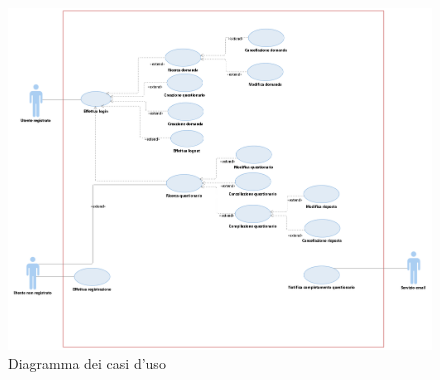 \documentclass[12pt]{article}
\begin{document}
\begin{figure}[H]
\includegraphics[scale=0.45, left]{fig_usecase_diagram.png}
\caption{Diagramma dei casi d'uso}
\end{figure}
\end{document}
